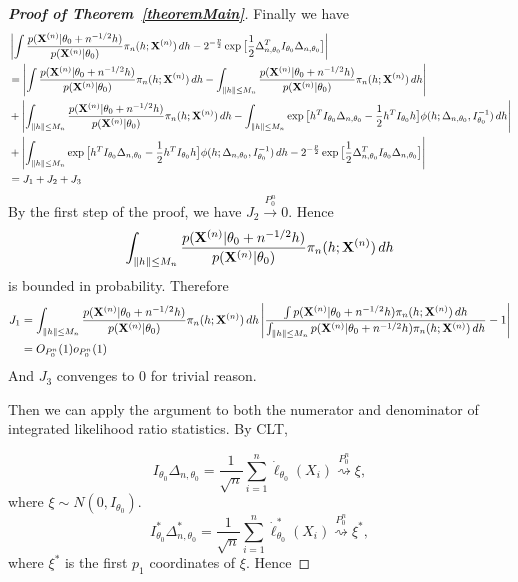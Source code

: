 \documentclass[11pt]{article}
\theoremstyle{plain}
\theoremstyle{definition}
\theoremstyle{remark}
\begin{document}
\begin{appendices}
\begin{proof}[\textbf{Proof of Theorem~\ref{theoremMain}}]
Finally we have
\begin{equation*}
    \begin{aligned}
        &\left|\int \frac{p(\mathbf{X}^{(n)}|\theta_0+n^{-1/2}h)}{p(\mathbf{X}^{(n)}|\theta_0)}\pi_n (h;\mathbf{X}^{(n)}) \, dh-2^{-\frac{p}{2}}\exp\big[\frac{1}{2}\Delta_{n,\theta_0}^T I_{\theta_0}\Delta_{n,\theta_0}\big]
 \right|\\
        &=\left|\int \frac{p(\mathbf{X}^{(n)}|\theta_0+n^{-1/2}h)}{p(\mathbf{X}^{(n)}|\theta_0)}\pi_n (h;\mathbf{X}^{(n)}) \, dh-\int_{\|h\|\leq M_n}\frac{p(\mathbf{X}^{(n)}|\theta_0+n^{-1/2}h)}{p(\mathbf{X}^{(n)}|\theta_0)}\pi_n (h;\mathbf{X}^{(n)}) \, dh\right|\\
        &+\left|\int_{\|h\|\leq M_n} \frac{p(\mathbf{X}^{(n)}|\theta_0+n^{-1/2}h)}{p(\mathbf{X}^{(n)}|\theta_0)}\pi_n (h;\mathbf{X}^{(n)}) \, dh -\int_{\|h\|\leq M_n} \exp\big[h^T I_{\theta_0}\Delta_{n,\theta_0}-\frac{1}{2}h^T I_{\theta_0}h\big]\phi(h;\Delta_{n,\theta_0},I_{\theta_0}^{-1})\, dh\right|\\
        &+\left| \int_{\|h\|\leq M_n} \exp\big[h^T I_{\theta_0}\Delta_{n,\theta_0}-\frac{1}{2}h^T I_{\theta_0}h\big]\phi(h;\Delta_{n,\theta_0},I_{\theta_0}^{-1})\, dh-2^{-\frac{p}{2}}\exp\big[\frac{1}{2}\Delta_{n,\theta_0}^T I_{\theta_0}\Delta_{n,\theta_0}\big]
 \right|\\
        &=J_1+J_2+J_3
\end{aligned}
\end{equation*}
By the first step of the proof, we have $J_2\xrightarrow{P^n_0}0$.
Hence 
$$
\int_{\|h\|\leq M_n} \frac{p(\mathbf{X}^{(n)}|\theta_0+n^{-1/2}h)}{p(\mathbf{X}^{(n)}|\theta_0)}\pi_n (h;\mathbf{X}^{(n)}) \, dh
$$ is bounded in probability. Therefore
\begin{equation*}
\begin{aligned}
    J_1&=
\int_{\|h\|\leq M_n} \frac{p(\mathbf{X}^{(n)}|\theta_0+n^{-1/2}h)}{p(\mathbf{X}^{(n)}|\theta_0)}\pi_n (h;\mathbf{X}^{(n)}) \, dh
\left|\frac{
\int p(\mathbf{X}^{(n)}|\theta_0+n^{-1/2}h)\pi_n (h;\mathbf{X}^{(n)}) \, dh}{\int_{\|h\|\leq M_n} p(\mathbf{X}^{(n)}|\theta_0+n^{-1/2}h)\pi_n (h;\mathbf{X}^{(n)}) \, dh}-1\right|\\
       &=O_{P_0^n}(1)o_{P_0^n}(1)
\end{aligned}
\end{equation*}
And $J_3$ convenges to $0$ for trivial reason.

    Then we can apply the argument to both the numerator and denominator of integrated likelihood ratio statistics. By CLT,

    \begin{equation}
    I_{\theta_0}\Delta_{n,\theta_0}=\frac{1}{\sqrt{n}}\sum^n_{i=1}\dot{\ell}_{\theta_0}(X_i)\overset{P_0^n}{\rightsquigarrow }\xi, 
\end{equation}
where $\xi\sim N(0,I_{\theta_0})$.
\begin{equation}
    I^*_{\theta_0}\Delta^*_{n,\theta_0}=\frac{1}{\sqrt{n}}\sum^n_{i=1}\dot{\ell}^*_{\theta_0}(X_i)\overset{P_0^n}{\rightsquigarrow} \xi^*, 
\end{equation}
where $\xi^*$ is the first $p_1$ coordinates of $\xi$. Hence



\end{proof}
\end{appendices}
\end{document}
